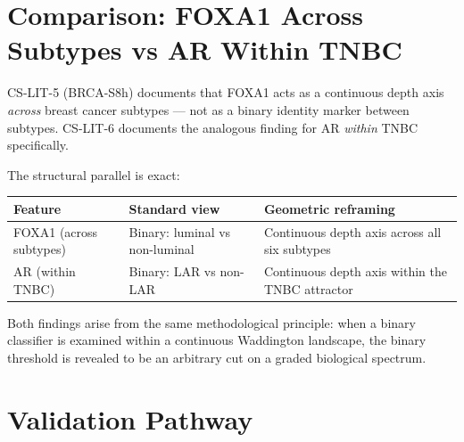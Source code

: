 \documentclass[12pt, a4paper]{article}
\begin{document}
\section{Comparison: FOXA1 Across Subtypes vs
AR Within TNBC}

CS-LIT-5 (BRCA-S8h) documents that FOXA1 acts
as a continuous depth axis \textit{across}
breast cancer subtypes --- not as a binary
identity marker between subtypes.
CS-LIT-6 documents the analogous finding for AR
\textit{within} TNBC specifically.

The structural parallel is exact:

\begin{center}
\begin{tabular}{p{4.5cm}p{4.5cm}p{3cm}}
\toprule
\textbf{Feature} &
\textbf{Standard view} &
\textbf{Geometric reframing} \\
\midrule
FOXA1 (across subtypes) &
Binary: luminal vs non-luminal &
Continuous depth axis
across all six subtypes \\[0.5em]
AR (within TNBC) &
Binary: LAR vs non-LAR &
Continuous depth axis
within the TNBC attractor \\
\bottomrule
\end{tabular}
\end{center}

\vspace{0.5em}

Both findings arise from the same methodological
principle: when a binary classifier is examined
within a continuous Waddington landscape, the
binary threshold is revealed to be an arbitrary
cut on a graded biological spectrum.

\section{Validation Pathway}
\end{document}
